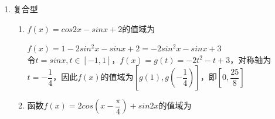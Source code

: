 \begin{enumerate}
\begin{enumerate}
\begin{enumerate}
\begin{jieda}
                令$t = 2tanx+1, t \in (1,3)$，$f(x) = g(t) = -1 + \dfrac{t}{1-\left(\dfrac{t-1}{2}\right)^2} = -1 + \dfrac{4t}{-t^2 + 2t +3} = -1 + \dfrac{4}{-t+\dfrac{3}{t}+2}$，$-t + \dfrac{3}{t} + 2 \in \left(0, 4\right)$，故$f(x) \in \left(0, +\infty\right)$
            \end{jieda} 
            \item $f(x) = \dfrac{1}{sin^2x} + \dfrac{4}{cos^2x}$的最小值为
            \begin{jieda}
                $f(x) = 1 + \dfrac{1}{tan^2x} + 4 + 4 tan^2x \geq 9$
            \end{jieda}
        \end{enumerate}
        \item 复合型
        \begin{enumerate}
            \item $f(x) = cos2x - sinx + 2$的值域为
            \begin{jieda}
                $f(x) = 1-2sin^2x - sinx + 2 = -2sin^2x - sinx + 3$ \\
                令$t = sinx, t \in [-1, 1]$，$f(x) = g(t) = -2t^2 - t + 3$，对称轴为$t = -\dfrac{1}{4}$，因此$f(x)$的值域为$\left[g\left(1\right), g\left(-\dfrac{1}{4}\right)\right]$，即$\left[0, \dfrac{25}{8}\right]$
            \end{jieda}
            \item 函数$f(x) = 2cos\left(x-\dfrac{\pi}{4}\right)+sin2x$的值域为
            \begin{jieda}
\end{jieda}
\end{enumerate}
\end{enumerate}
\end{enumerate}
